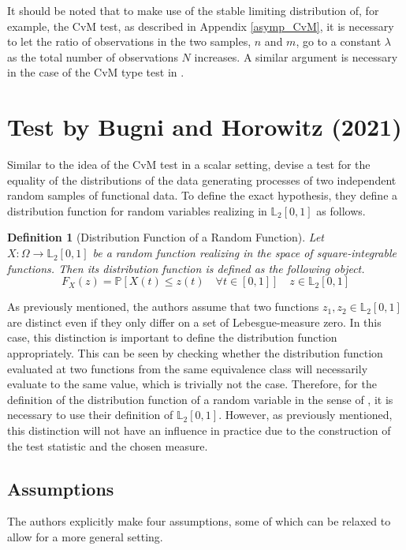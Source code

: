 \documentclass[12pt, a4paper]{article}
\theoremstyle{MAstyle} \newtheorem{assumption}{Assumption}[section]
\theoremstyle{MAstyle} \newtheorem{definition}{Definition}[section]
\theoremstyle{MAstyle} \newtheorem{theorem}{Theorem}[section]
\begin{document}
			It should be noted that to make use of the stable limiting distribution of, for example, the CvM test, as described in Appendix \ref{asymp_CvM}, it is necessary to let the ratio of observations in the two samples, $n$ and $m$, go to a constant $\lambda$ as the total number of observations $N$ increases. A similar argument is necessary in the case of the CvM type test in \cite{bugni_permutation_2021}.
		
	\section{Test by Bugni and Horowitz (2021)}\label{Bugni_Horowitz_2021}
	
		Similar to the idea of the CvM test in a scalar setting, \cite{bugni_permutation_2021} devise a test for the equality of the distributions of the data generating processes of two independent random samples of functional data. 
		To define the exact hypothesis, they define a distribution function for random variables realizing in $\mathbb{L}_2[0,1]$ as follows.
		\begin{definition}[Distribution Function of a Random Function]\label{dist_func}
			Let $X:\Omega \rightarrow \mathbb{L}_2[0,1]$ be a random function realizing in the space of square-integrable functions. Then its distribution function is defined as the following object.
			\begin{equation*}
				F_X(z) = \mathbb{P}\left[X(t) \leq z(t) \quad \forall t \in [0,1]\right] \quad z \in \mathbb{L}_2[0,1]
			\end{equation*}
		\end{definition}
		As previously mentioned, the authors assume that two functions $z_1, z_2 \in \mathbb{L}_2[0,1]$ are distinct even if they only differ on a set of Lebesgue-measure zero. In this case, this distinction is important to define the distribution function appropriately. This can be seen by checking whether the distribution function evaluated at two functions from the same equivalence class will necessarily evaluate to the same value, which is trivially not the case. Therefore, for the definition of the distribution function of a random variable in the sense of \cite{bugni_permutation_2021}, it is necessary to use their definition of $\mathbb{L}_2[0,1]$.
		However, as previously mentioned, this distinction will not have an influence in practice due to the construction of the test statistic and the chosen measure.

		\subsection{Assumptions}\label{Assumptions}
		The authors explicitly make four assumptions, some of which can be relaxed to allow for a more general setting.
		
\end{document}
